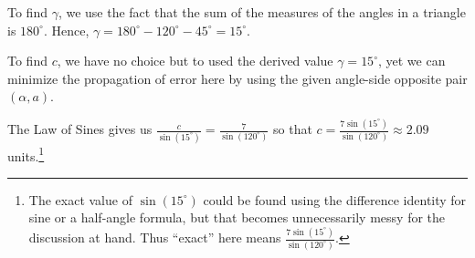 \documentclass{ximera}
\begin{document}
\begin{example}
\begin{explanation}
\begin{enumerate}
 

To find $\gamma$, we use the fact that the sum of the measures of the angles in a triangle is $180^{\circ}$. Hence, $\gamma = 180^{\circ} - 120^{\circ} - 45^{\circ} = 15^{\circ}$.  

 

To find $c$, we have no choice but to used the derived value $\gamma = 15^{\circ}$, yet we can minimize the propagation of error here by using the given angle-side opposite pair $(\alpha, a)$. 

 \begin{image}
\end{image}

The Law of Sines gives us  $\frac{c}{\sin\left(15^{\circ}\right)} = \frac{7}{\sin\left(120^{\circ}\right)}$ so that $c = \frac{7\sin\left(15^{\circ}\right)}{\sin\left(120^{\circ}\right)} \approx 2.09$ units.\footnote{The exact value of $\sin(15^{\circ})$ could be found using the difference identity for sine or a half-angle formula, but that becomes unnecessarily messy for the discussion at hand.  Thus ``exact'' here means $\frac{7\sin\left(15^{\circ}\right)}{\sin\left(120^{\circ}\right)}$.}


\end{enumerate}
\end{explanation}
\end{example}
\end{document}
